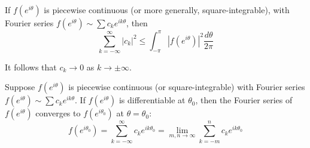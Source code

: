 \documentclass[12pt, a4paper, oneside, openright, titlepage]{book}
\begin{document}
\begin{namthm}
    If $f(e^{i\theta})$ is piecewise continuous (or more generally, square-integrable), with Fourier series $f(e^{i\theta})\sim \sum c_ke^{ik\theta}$, then \begin{equation*}
        \sum_{k=-\infty}^{\infty}|c_k|^2 \leq \int_{-\pi}^{\pi}|f(e^{i\theta})|^2\frac{d\theta}{2\pi}
    \end{equation*}
\end{namthm}
It follows that $c_k\rightarrow 0$ as $k\rightarrow \pm \infty$.

\begin{thm}
    Suppose $f(e^{i\theta})$ is piecewise continuous (or square-integrable) with Fourier series $f(e^{i\theta}) \sim \sum c_ke^{ik\theta}$. If $f(e^{i\theta})$ is differentiable at $\theta_0$, then the Fourier series of $f(e^{i\theta})$ converges to $f(e^{i\theta_0})$ at $\theta = \theta_0$: \begin{equation*}
        f(e^{i\theta_0}) = \sum_{k=-\infty}^{\infty}c_ke^{ik\theta_0} = \lim\limits_{m,n\rightarrow \infty}\sum_{k=-m}^nc_ke^{ik\theta_0}
    \end{equation*}
\end{thm}
\end{document}
